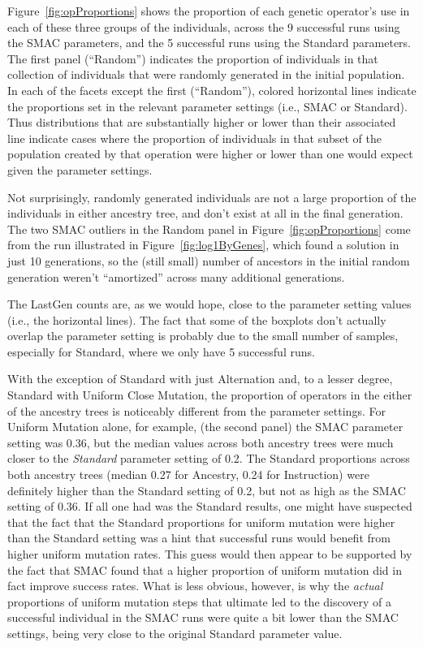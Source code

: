 Figure~\ref{fig:opProportions} shows the proportion of each genetic 
operator's use in each of these three groups of the individuals, across
the 9 successful runs using the SMAC parameters, and the 5 successful runs
using the Standard parameters. The first
panel (``Random'') indicates the proportion of individuals in that collection
of individuals that were randomly generated in the initial population. 
In each of
the facets except the first (``Random''), colored horizontal lines indicate
the proportions set in the relevant parameter settings (i.e., SMAC or
Standard). Thus distributions that are substantially higher or lower than
their associated line indicate cases where the proportion of individuals in
that subset of the population created by that operation were higher or
lower than one would expect given the parameter settings.

Not surprisingly, randomly generated individuals are not a large
proportion of the individuals in either ancestry tree, and don't exist
at all in the final generation. The two SMAC outliers in the Random panel in Figure~\ref{fig:opProportions} come from the run
illustrated in Figure~\ref{fig:log1ByGenes}, which found a solution in 
just 10 generations, so the (still small) number
of ancestors in the initial random generation weren't ``amortized''
across many additional generations.

The LastGen counts are, as we would hope, close to the parameter
setting values (i.e., the horizontal lines). The fact that some of the
boxplots don't actually overlap the parameter setting is probably due
to the small number of samples, especially for Standard, where we only
have 5 successful runs.

With the exception of Standard with just Alternation and, to a
lesser degree, Standard with Uniform Close Mutation, the proportion
of operators in the either of the ancestry trees is noticeably
different from the parameter settings. For Uniform Mutation alone, for 
example, (the second panel) the SMAC parameter setting
was 0.36, but the median values across both ancestry trees were much closer to
the \emph{Standard} parameter setting of 0.2. The Standard proportions across
both ancestry trees (median 0.27 for Ancestry, 0.24 for Instruction) were definitely higher than the Standard setting of 0.2, but not as high as the
SMAC setting of 0.36. If all one had was the Standard results, one might 
have suspected that the fact that
the Standard proportions for uniform mutation were higher than the Standard
setting was a hint that successful runs would benefit from higher uniform
mutation rates. This guess would then appear to be supported by the fact
that SMAC found that a higher proportion of uniform mutation did in fact
improve success rates. What is less obvious, however, is why the \emph{actual}
proportions of uniform mutation steps that ultimate led to the discovery of
a successful individual in the SMAC runs were quite a bit lower than the SMAC
settings, being very close to the original Standard parameter value.

